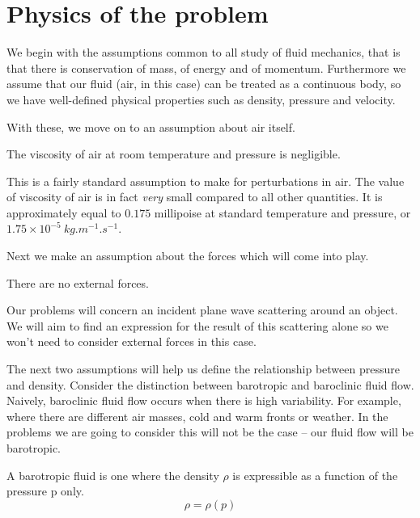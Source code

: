 \section{Physics of the problem}
We begin with the assumptions common to all study of fluid mechanics, that is that there is conservation of mass, of energy and of momentum. Furthermore we assume that our fluid (air, in this case) can be treated as a continuous body, so we have well-defined physical properties such as density, pressure and velocity.\par
%
With these, we move on to an assumption about air itself.\par
\begin{assumption}\label{assumption:no_viscosity}
  The viscosity of air at room temperature and pressure is negligible.
\end{assumption}
%
This is a fairly standard assumption to make for perturbations in air. The value of viscosity of air is in fact \emph{very} small compared to all other quantities. It is approximately equal to $0.175$ millipoise \cite[Table 333]{forsythe03tables} at standard temperature and pressure, or $1.75\times10^{-5} ~\si{kg.m^{-1}.s^{-1}}$.\par
%
Next we make an assumption about the forces which will come into play.
\begin{assumption}\label{assumption:no_external_forces}
  There are no external forces.
\end{assumption}
%
Our problems will concern an incident plane wave scattering around an object. We will aim to find an expression for the result of this scattering alone so we won't need to consider external forces in this case. \par
%
The next two assumptions will help us define the relationship between pressure and density.
%
Consider the distinction between barotropic and baroclinic fluid flow. Naively, baroclinic fluid flow occurs when there is high variability. For example, where there are different air masses, cold and warm fronts or weather. In the problems we are going to consider this will not be the case -- our fluid flow will be barotropic.
\begin{defn} \parencite{shames02mechanics} A barotropic fluid is one where the density $\rho$ is expressible as a function of the pressure p only.
    \[ \rho = \rho(p)\]
\end{defn}
